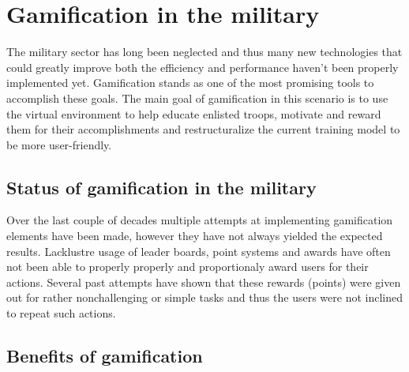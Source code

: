\documentclass[10pt,twoside,slovak,a4paper]{article}
\begin{document}



\section{Gamification in the military} \label{body}

The military sector has long been neglected and thus many new technologies that could greatly improve both the efficiency and performance haven’t been properly implemented yet. Gamification stands as one of the most promising tools to accomplish these goals. The main goal of gamification in this scenario is to use the virtual environment to help educate enlisted troops, motivate and reward them for their accomplishments and restructuralize the current training model to be more user-friendly\cite{tomcho2019motivating}.



\subsection{Status of gamification in the military} \label{status}

Over the last couple of decades multiple attempts at implementing gamification elements have been made, however they have not always yielded the expected results. Lacklustre usage of leader boards, point systems and awards have often not been able to properly properly and proportionaly award users for their actions. Several past attempts have shown that these rewards (points) were given out for rather nonchallenging or simple tasks and thus the users were not inclined to repeat such actions\cite{tomcho2019motivating}.


\subsection{Benefits of gamification} \label{benefits}
\end{document}
